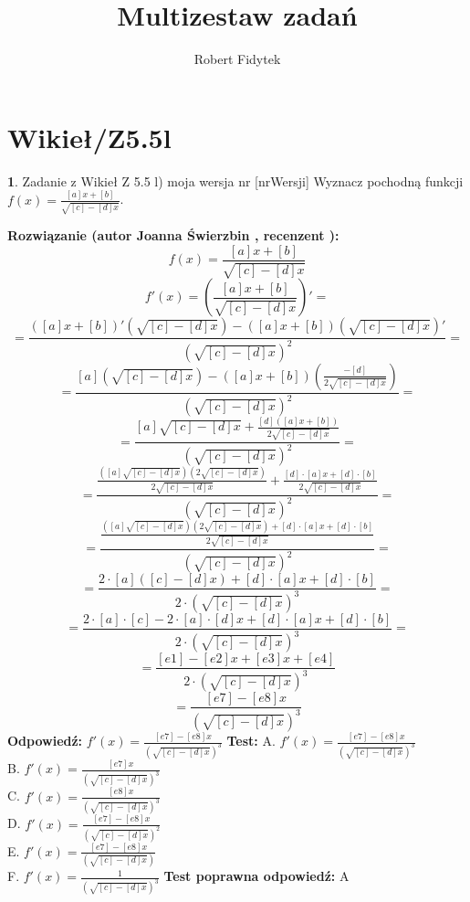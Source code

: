 \documentclass[12pt, a4paper]{article}
\title{Multizestaw zadań}
\author{Robert Fidytek}
\date{}
\theoremstyle{definition} %
\newtheorem{zad}{}
\newcommand{\kategoria}[1]{\section{#1}} %
\newcommand{\zadStart}[1]{\begin{zad}#1\newline} %
\newcommand{\zadStop}{\end{zad}}   %
\newcommand{\rozwStart}[2]{\noindent \textbf{Rozwiązanie (autor #1 , recenzent #2): }\newline} %
\newcommand{\rozwStop}{\newline}                                            %
\newcommand{\odpStart}{\noindent \textbf{Odpowiedź:}\newline}    %
\newcommand{\odpStop}{\newline}                                             %
\newcommand{\testStart}{\noindent \textbf{Test:}\newline} %
\newcommand{\testStop}{\newline} %
\newcommand{\kluczStart}{\noindent \textbf{Test poprawna odpowiedź:}\newline} %
\newcommand{\kluczStop}{\newline} %
\begin{document}
\maketitle


\kategoria{Wikieł/Z5.5l}
\zadStart{Zadanie z Wikieł Z 5.5 l) moja wersja nr [nrWersji]}
Wyznacz pochodną funkcji \\ $f(x)=\frac{[a]x+[b]}{\sqrt{[c]-[d]x}}$.
\zadStop
\rozwStart{Joanna Świerzbin}{}
$$f(x)=\frac{[a]x+[b]}{\sqrt{[c]-[d]x}}$$
$$f'(x)= \left( \frac{[a]x+[b]}{\sqrt{[c]-[d]x}} \right)' =$$
$$ = \frac{\left([a]x+[b]\right)'\left(\sqrt{[c]-[d]x}\right)-\left([a]x+[b]\right)\left(\sqrt{[c]-[d]x}\right)'}{\left(\sqrt{[c]-[d]x}\right)^2}  =$$
$$ = \frac{[a]\left(\sqrt{[c]-[d]x}\right)-\left([a]x+[b]\right)\left( \frac {-[d]}{2\sqrt{[c]-[d]x}}\right)}{\left(\sqrt{[c]-[d]x}\right)^2} =$$
$$ = \frac{[a]\sqrt{[c]-[d]x} + \frac {[d]\left([a]x+[b]\right)}{2\sqrt{[c]-[d]x}}}{\left(\sqrt{[c]-[d]x}\right)^2} =$$
$$ = \frac{\frac{\left([a]\sqrt{[c]-[d]x}\right)\left(2\sqrt{[c]-[d]x}\right)}{2\sqrt{[c]-[d]x}}+ \frac {[d]\cdot[a]x+[d]\cdot[b]}{2\sqrt{[c]-[d]x}}}{\left(\sqrt{[c]-[d]x}\right)^2} =$$
$$ = \frac{\frac{\left([a]\sqrt{[c]-[d]x}\right)\left(2\sqrt{[c]-[d]x}\right)+ [d]\cdot[a]x+[d]\cdot[b]}{2\sqrt{[c]-[d]x}}}{\left(\sqrt{[c]-[d]x}\right)^2} =$$
$$ = \frac{2\cdot[a]([c]-[d]x) + [d]\cdot[a]x+[d]\cdot[b]}{2\cdot \left(\sqrt{[c]-[d]x}\right)^3} =$$
$$ = \frac{2\cdot[a]\cdot[c]-2\cdot[a]\cdot[d]x + [d]\cdot[a]x+[d]\cdot[b]}{2\cdot \left(\sqrt{[c]-[d]x}\right)^3} =$$
$$ = \frac{[e1]-[e2]x+[e3]x+[e4]}{2 \cdot \left(\sqrt{[c]-[d]x}\right)^3} $$
$$ = \frac{[e7]-[e8]x}{\left(\sqrt{[c]-[d]x}\right)^3} $$
\rozwStop
\odpStart
$ f'(x) = \frac{[e7]-[e8]x}{\left(\sqrt{[c]-[d]x}\right)^3} $
\odpStop
\testStart
A. $ f'(x)= \frac{[e7]-[e8]x}{\left(\sqrt{[c]-[d]x}\right)^3} $\\
B. $ f'(x)= \frac{[e7]x}{\left(\sqrt{[c]-[d]x}\right)^3} $ \\
C. $ f'(x)= \frac{[e8]x}{\left(\sqrt{[c]-[d]x}\right)^3}$ \\
D. $ f'(x)= \frac{[e7]-[e8]x}{\left(\sqrt{[c]-[d]x}\right)^2}$\\
E. $ f'(x)= \frac{[e7]-[e8]x}{\left(\sqrt{[c]-[d]x}\right)} $\\
F. $ f'(x)= \frac{1}{\left(\sqrt{[c]-[d]x}\right)^3} $
\testStop
\kluczStart
A
\kluczStop
\end{document}
